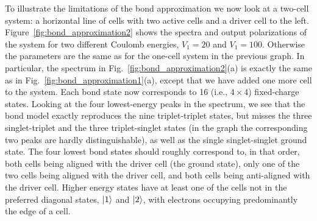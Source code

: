 To illustrate the limitations of the bond approximation we now look at a
two-cell system: a horizontal line of cells with two active cells and a driver
cell to the left. Figure~\ref{fig:bond_approximation2} shows the spectra and
output polarizations of the system for two different Coulomb energies, $V_1 =
20$ and $V_1 = 100$. Otherwise the parameters are the same as for the one-cell
system in the previous graph. In particular, the spectrum in
Fig.~\ref{fig:bond_approximation2}(a) is exactly the same as in
Fig.~\ref{fig:bond_approximation1}(a), except that we have added one more cell
to the system. Each bond state now corresponds to 16 (i.e., $4 \times 4$)
fixed-charge states. Looking at the four lowest-energy peaks in the spectrum, we
see that the bond model exactly reproduces the nine triplet-triplet states, but
misses the three singlet-triplet and the three triplet-singlet states (in the
graph the corresponding two peaks are hardly distinguishable), as well as the
single singlet-singlet ground state. The four lowest bond states should roughly
correspond to, in that order, both cells being aligned with the driver cell (the
ground state), only one of the two cells being aligned with the driver cell, and
both cells being anti-aligned with the driver cell. Higher energy states have at
least one of the cells not in the preferred diagonal states, $\left|1\right>$ and
$\left|2\right>$, with electrons occupying predominantly the edge of a cell.

